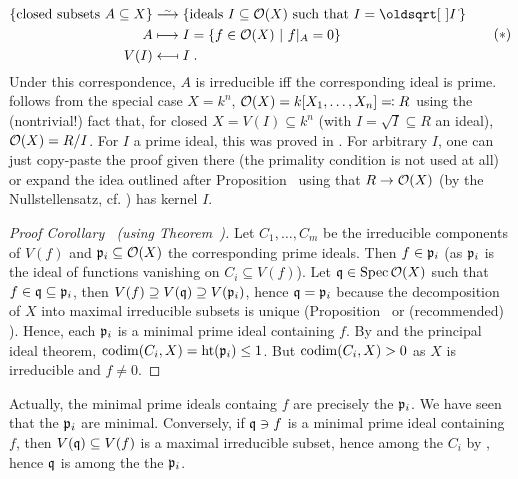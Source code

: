 \documentclass[a4paper,parskip=half,numbers=enddot, DIV=12, headheight=30pt]{scrreprt}
\begin{document}
\begin{rem}
\begin{alphanumerate}
        \begin{align}\lbl{eq:bijectiveCorrespondenceO(X)}
	        \begin{split}
		        \{\text{closed subsets }A\subseteq X\}&\isomorphism\left\{\text{ideals }I\subseteq \Oo(X)\text{ such that }I=\sqrt{I}\right\}\\
		        A&\longmapsto I=\left\{f\in \Oo(X)\st f|_A=0\right\}\\
		        V(I)&\longmapsfrom I\;.
	        \end{split}\tag{$*$}
        \end{align}
        Under this correspondence, $A$ is irreducible iff the corresponding ideal is prime.  follows from the special case $X=k^n$, $\mathcal{O}(X)=k[X_1,\ldots,X_n]\eqqcolon R$ using the (nontrivial!) fact that, for closed $X=V(I)\subseteq k^n$ (with $I=\sqrt{I}\subseteq R$ an ideal), $\mathcal{O}(X)=R/I$. For $I$ a prime ideal, this was proved in \cite[Proposition~2.2.2]{alg1}. For arbitrary $I$, one can just copy-paste the proof given there (the primality condition is not used at all) or expand the idea outlined after Proposition~ using that $R\to\mathcal{O}(X)$ (by the Nullstellensatz, cf. \cite[Proposition~1.7.1]{alg1}) has kernel $I$.
    \end{alphanumerate}
\end{rem}
\begin{proof}[Proof Corollary~ (using Theorem~)]
	Let $C_1,\ldots,C_m$ be the irreducible components of $V(f)$ and $\mathfrak{p}_i\subseteq\mathcal{O}(X)$ the corresponding prime ideals. Then $f\in\mathfrak{p}_i$ (as $\mathfrak{p}_i$ is the ideal of functions vanishing on $C_i\subseteq V(f)$). Let $\mathfrak{q}\in\operatorname{Spec}\mathcal{O}(X)$ such that $f\in\mathfrak{q}\subseteq\mathfrak{p}_i$, then $V(f)\supseteq V(\mathfrak{q})\supseteq V(\mathfrak{p}_i)$, hence $\mathfrak{q}=\mathfrak{p}_i$ because the decomposition of $X$ into maximal irreducible subsets is unique (Proposition~ or (recommended) \cite[Proposition~2.1.1]{alg1}). Hence, each $\mathfrak{p}_i$ is a minimal prime ideal containing $f$. By  and the principal ideal theorem, $\operatorname{codim}(C_i,X)=\operatorname{ht}(\mathfrak{p}_i)\leq1$. But $\operatorname{codim}(C_i,X)>0$ as $X$ is irreducible and $f\not=0$.
\end{proof}
\begin{rem*}
	Actually, the minimal prime ideals containg $f$ are precisely the $\mathfrak{p}_i$. We have seen that the $\mathfrak{p}_i$ are minimal. Conversely, if $\mathfrak{q}\ni f$ is a minimal prime ideal containing $f$, then $V(\mathfrak{q})\subseteq V(f)$ is a maximal irreducible subset, hence among the $C_i$ by \cite[Proposition~2.1.1]{alg1}, hence $\mathfrak{q}$ is among the the $\mathfrak{p}_i$.
\end{rem*}
\end{document}
